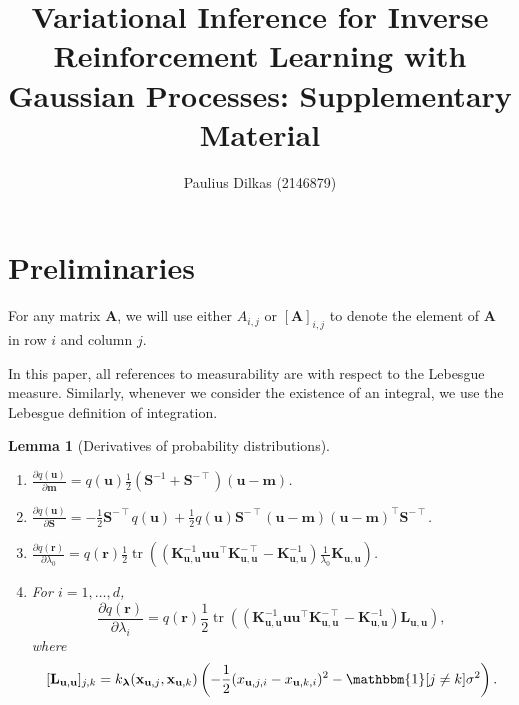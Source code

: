 \documentclass{article}
\title{Variational Inference for Inverse Reinforcement Learning with Gaussian
  Processes: Supplementary Material}
\author{Paulius Dilkas (2146879)}
\newtheorem{lemma}[theorem]{Lemma}
\theoremstyle{definition}
\theoremstyle{remark}
\DeclareMathOperator{\tr}{tr}
\newcommand{\Kuu}{\mathbf{K}_{\mathbf{u},\mathbf{u}}}
\newcommand{\Luu}{\mathbf{L}_{\mathbf{u},\mathbf{u}}}
\begin{document}
\maketitle

\section{Preliminaries}

For any matrix $\mathbf{A}$, we will use either $A_{i,j}$ or
$[\mathbf{A}]_{i,j}$ to denote the element of $\mathbf{A}$ in row $i$ and column
$j$.

In this paper, all references to measurability are with respect to the Lebesgue
measure. Similarly, whenever we consider the existence of an integral, we use
the Lebesgue definition of integration.

\begin{lemma}[Derivatives of probability
  distributions] \label{lemma:derivatives}
  \begin{enumerate}
    \leavevmode
  \item $\frac{\partial q(\mathbf{u})}{\partial \mathbf{m}} =
    q(\mathbf{u})\frac{1}{2}(\mathbf{S}^{-1} +
    \mathbf{S}^{-\intercal})(\mathbf{u} - \mathbf{m})$.
  \item $\frac{\partial q(\mathbf{u})}{\partial \mathbf{S}} =
    -\frac{1}{2}\mathbf{S}^{-\intercal}q(\mathbf{u}) +
    \frac{1}{2}q(\mathbf{u})\mathbf{S}^{-\intercal}(\mathbf{u} -
    \mathbf{m})(\mathbf{u} - \mathbf{m})^\intercal\mathbf{S}^{-\intercal}$.
  \item $\frac{\partial q(\mathbf{r})}{\partial \lambda_0} =
    q(\mathbf{r})\frac{1}{2}\tr
    \left((\Kuu^{-1}\mathbf{u}\mathbf{u}^\intercal\Kuu^{-\intercal} - \Kuu^{-1})
      \frac{1}{\lambda_0}\Kuu \right)$.
  \item For $i = 1, \dots, d$,
    \[
      \frac{\partial q(\mathbf{r})}{\partial \lambda_i} =
      q(\mathbf{r})\frac{1}{2}\tr
      \left((\Kuu^{-1}\mathbf{u}\mathbf{u}^\intercal\Kuu^{-\intercal} - \Kuu^{-1})
        \Luu \right),
    \]
    where
    \[
      [\Luu]_{j,k} = k_{\bm\lambda}(\mathbf{x}_{\mathbf{u},j},
      \mathbf{x}_{\mathbf{u},k}) \left( -\frac{1}{2}(x_{\mathbf{u},j,i} -
        x_{\mathbf{u},k,i})^2 - \mathbbm{1}[j \ne k]\sigma^2 \right).
    \]
  \end{enumerate}
\end{lemma}
\end{document}
